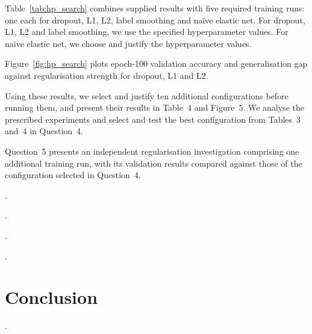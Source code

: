 \documentclass{article}
\begin{document}
Table~\ref{tab:hp_search} combines supplied results with
five required training runs: one each for dropout, L1,
L2, label smoothing and na\"ive elastic net. For dropout,
L1, L2 and label smoothing, we use the specified
hyperparameter values. For na\"ive elastic net, we choose
and justify the hyperparameter values.

Figure~\ref{fig:hp_search} plots epoch-100 validation
accuracy and generalisation gap against regularisation
strength for dropout, L1 and L2.

Using these results, we select and justify ten additional
configurations before running them, and present their
results in Table~4 and Figure~5. We analyse the prescribed
experiments and select and test the best configuration
from Tables~3 and~4 in Question~4.

Question~5 presents an independent regularisation
investigation comprising one additional training run,
with its validation results compared against those of
the configuration selected in Question~4.

\questionTwo.

\questionThree.


\questionFour.

\questionFive.

\section{Conclusion}
\label{sec:concl}
    
\questionSix.

\newpage

\end{document}
